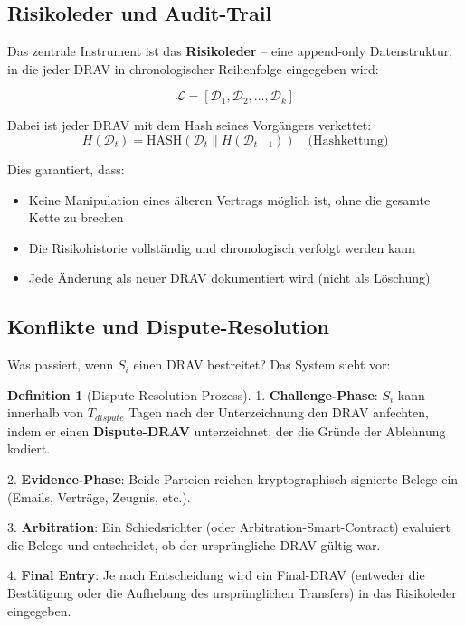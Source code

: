 \documentclass[a4paper,12pt]{article}
\theoremstyle{definition}
\newtheorem{definition}{Definition}
\begin{document}
\subsection{Risikoleder und Audit-Trail}

Das zentrale Instrument ist das \textbf{Risikoleder} -- eine append-only Datenstruktur, in die jeder DRAV in chronologischer Reihenfolge eingegeben wird:

\begin{equation}
\mathcal{L} = [\mathcal{D}_1, \mathcal{D}_2, \ldots, \mathcal{D}_k]
\end{equation}

Dabei ist jeder DRAV mit dem Hash seines Vorgängers verkettet:
\begin{equation}
H(\mathcal{D}_t) = \text{HASH}(\mathcal{D}_t \| H(\mathcal{D}_{t-1})) \quad \text{(Hashkettung)}
\end{equation}

Dies garantiert, dass:
\begin{itemize}
    \item Keine Manipulation eines älteren Vertrags möglich ist, ohne die gesamte Kette zu brechen
    \item Die Risikohistorie vollständig und chronologisch verfolgt werden kann
    \item Jede Änderung als neuer DRAV dokumentiert wird (nicht als Löschung)
\end{itemize}

\subsection{Konflikte und Dispute-Resolution}

Was passiert, wenn $S_i$ einen DRAV bestreitet? Das System sieht vor:

\begin{definition}[Dispute-Resolution-Prozess]
1. \textbf{Challenge-Phase}: $S_i$ kann innerhalb von $T_{dispute}$ Tagen nach der Unterzeichnung den DRAV anfechten, indem er einen \textbf{Dispute-DRAV} unterzeichnet, der die Gründe der Ablehnung kodiert.

2. \textbf{Evidence-Phase}: Beide Parteien reichen kryptographisch signierte Belege ein (Emails, Verträge, Zeugnis, etc.).

3. \textbf{Arbitration}: Ein Schiedsrichter (oder Arbitration-Smart-Contract) evaluiert die Belege und entscheidet, ob der ursprüngliche DRAV gültig war.

4. \textbf{Final Entry}: Je nach Entscheidung wird ein Final-DRAV (entweder die Bestätigung oder die Aufhebung des ursprünglichen Transfers) in das Risikoleder eingegeben.
\end{definition}
\end{document}
